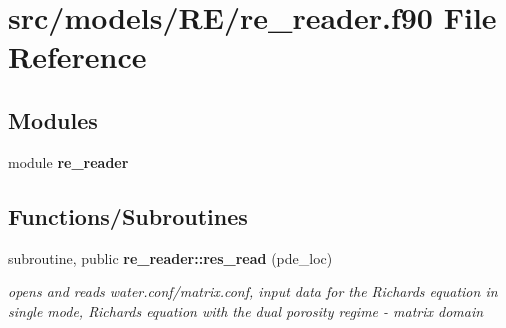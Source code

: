 \section{src/models/\+R\+E/re\+\_\+reader.f90 File Reference}
\label{re__reader_8f90}
\subsection*{Modules}
\begin{DoxyCompactItemize}
\item 
module {\bf re\+\_\+reader}
\end{DoxyCompactItemize}
\subsection*{Functions/\+Subroutines}
\begin{DoxyCompactItemize}
\item 
subroutine, public {\bf re\+\_\+reader\+::res\+\_\+read} (pde\+\_\+loc)
\begin{DoxyCompactList}\small\item\em opens and reads water.\+conf/matrix.conf, input data for the Richards equation in single mode, Richards equation with the dual porosity regime -\/ matrix domain \end{DoxyCompactList}\end{DoxyCompactItemize}
